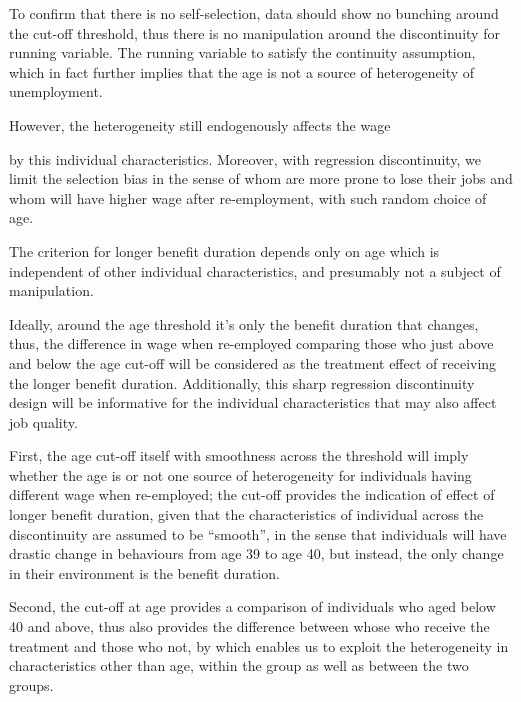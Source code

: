 \documentclass[a4paper,12pt,oneside,English]{article}
\begin{document}
To confirm that there is no self-selection, data should show no bunching around the cut-off threshold, thus there is no manipulation around the discontinuity for running variable. The running variable to satisfy the continuity assumption, which in fact further implies that the age is not a source of heterogeneity of unemployment. 

However, the heterogeneity still endogenously affects the wage 

by this individual characteristics. Moreover, with regression discontinuity, we limit the selection bias in the sense of whom are more prone to lose their jobs and whom will have higher wage after re-employment, with such random choice of age.

The criterion for longer benefit duration depends only on age which is independent of other individual characteristics, and presumably not a subject of manipulation. 

Ideally, around the age threshold it’s only the benefit duration that changes, thus, the difference in wage when re-employed comparing those who just above and below the age cut-off will be considered as the treatment effect of receiving the longer benefit duration. 
Additionally, this sharp regression discontinuity design will be informative for the individual characteristics that may also affect job quality. 

First, the age cut-off itself with smoothness across the threshold will imply whether the age is or not one source of heterogeneity for individuals having different wage when re-employed; the cut-off provides the indication of effect of longer benefit duration, given that the characteristics of individual across the discontinuity are assumed to be “smooth”, in the sense that individuals will have drastic change in behaviours from age 39 to age 40, but instead, the only change in their environment is the benefit duration.

Second, the cut-off at age provides a comparison of individuals who aged below 40 and above, thus also provides the difference between whose who receive the treatment and those who not, by which enables us to exploit the heterogeneity in characteristics other than age, within the group as well as between the two groups. \\
\end{document}
